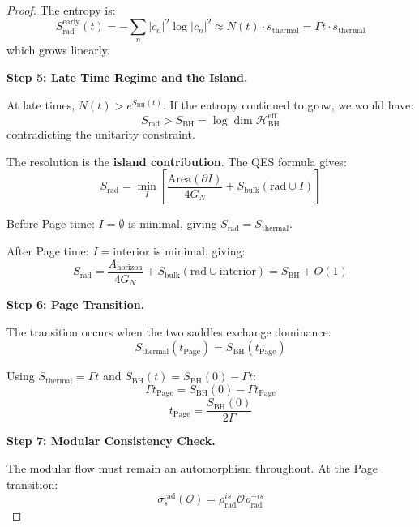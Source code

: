 \documentclass[12pt,a4paper]{article}
\begin{document}
\begin{proof}
The entropy is:
\begin{equation}
S_{\text{rad}}^{\text{early}}(t) = -\sum_n |c_n|^2 \log|c_n|^2 \approx N(t) \cdot s_{\text{thermal}} = \Gamma t \cdot s_{\text{thermal}}
\end{equation}
which grows linearly.

\textbf{Step 5: Late Time Regime and the Island.}

At late times, $N(t) > e^{S_{\text{BH}}(t)}$. If the entropy continued to grow, we would have:
\begin{equation}
S_{\text{rad}} > S_{\text{BH}} = \log\dim\mathcal{H}_{\text{BH}}^{\text{eff}}
\end{equation}
contradicting the unitarity constraint.

The resolution is the \textbf{island contribution}. The QES formula gives:
\begin{equation}
S_{\text{rad}} = \min_I \left[ \frac{\text{Area}(\partial I)}{4G_N} + S_{\text{bulk}}(\text{rad} \cup I) \right]
\end{equation}

Before Page time: $I = \emptyset$ is minimal, giving $S_{\text{rad}} = S_{\text{thermal}}$.

After Page time: $I = \text{interior}$ is minimal, giving:
\begin{equation}
S_{\text{rad}} = \frac{A_{\text{horizon}}}{4G_N} + S_{\text{bulk}}(\text{rad} \cup \text{interior}) = S_{\text{BH}} + O(1)
\end{equation}

\textbf{Step 6: Page Transition.}

The transition occurs when the two saddles exchange dominance:
\begin{equation}
S_{\text{thermal}}(t_{\text{Page}}) = S_{\text{BH}}(t_{\text{Page}})
\end{equation}

Using $S_{\text{thermal}} = \Gamma t$ and $S_{\text{BH}}(t) = S_{\text{BH}}(0) - \Gamma t$:
\begin{equation}
\Gamma t_{\text{Page}} = S_{\text{BH}}(0) - \Gamma t_{\text{Page}}
\end{equation}
\begin{equation}
t_{\text{Page}} = \frac{S_{\text{BH}}(0)}{2\Gamma}
\end{equation}

\textbf{Step 7: Modular Consistency Check.}

The modular flow must remain an automorphism throughout. At the Page transition:
\begin{equation}
\sigma_s^{\text{rad}}(\mathcal{O}) = \rho_{\text{rad}}^{is} \mathcal{O} \rho_{\text{rad}}^{-is}
\end{equation}


\end{proof}
\end{document}
